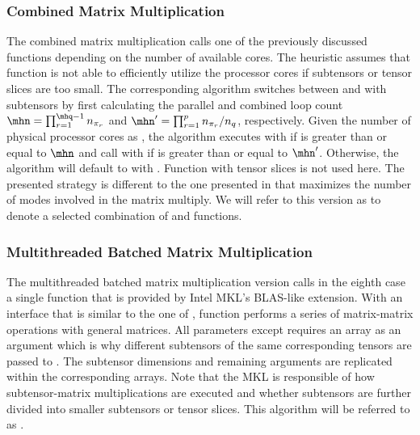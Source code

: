 \subsubsection{Combined Matrix Multiplication}
The combined matrix multiplication calls one of the previously discussed functions depending on the number of available cores.
The heuristic assumes that function  is not able to efficiently utilize the processor cores if subtensors or tensor slices are too small.
The corresponding algorithm switches between  and  with subtensors by first calculating the parallel and combined loop count $\mhn = \prod_{r=1}^{\mhq-1} n_{\pi_r}$ and $\mhn' = \prod_{r=1}^{p} n_{\pi_r} / n_q$, respectively.
Given the number of physical processor cores as , the algorithm executes  with  if  is greater than or equal to $\mhn$ and call  with  if  is greater than or equal to $\mhn'$.
Otherwise, the algorithm will default to  with .
Function  with tensor slices is not used here.
The presented strategy is different to the one presented in \cite{li:2015:input} that maximizes the number of modes involved in the matrix multiply.
We will refer to this version as  to denote a selected combination of  and  functions.

\subsubsection{Multithreaded Batched Matrix Multiplication}
The multithreaded batched matrix multiplication version calls in the eighth case a single  function that is provided by Intel MKL's BLAS-like extension.
With an interface that is similar to the one of , function  performs a series of matrix-matrix operations with general matrices.
All parameters except  requires an array as an argument which is why different subtensors of the same corresponding tensors are passed to .
The subtensor dimensions and remaining  arguments are replicated within the corresponding arrays.
Note that the MKL is responsible of how subtensor-matrix multiplications are executed and whether subtensors are further divided into smaller subtensors or tensor slices.
This algorithm will be referred to as .
